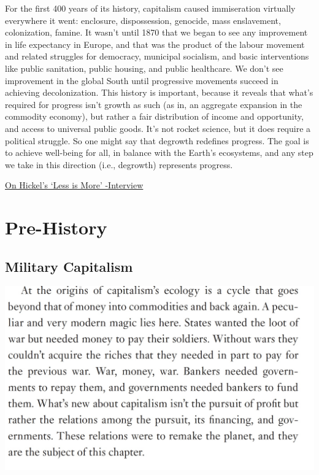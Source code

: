 \documentclass[
]{book}
\begin{document}
For the first 400 years of its history, capitalism caused immiseration virtually everywhere it went: enclosure, dispossession, genocide, mass enslavement, colonization, famine. It wasn't until 1870 that we began to see any improvement in life expectancy in Europe, and that was the product of the labour movement and related struggles for democracy, municipal socialism, and basic interventions like public sanitation, public housing, and public healthcare. We don't see improvement in the global South until progressive movements succeed in achieving decolonization. This history is important, because it reveals that what's required for progress isn't growth as such (as in, an aggregate expansion in the commodity economy), but rather a fair distribution of income and opportunity, and access to universal public goods. It's not rocket science, but it does require a political struggle. So one might say that degrowth redefines progress. The goal is to achieve well-being for all, in balance with the Earth's ecosystems, and any step we take in this direction (i.e., degrowth) represents progress.

\href{https://www.the-trouble.com/content/2021/2/11/ecosocialism-is-the-horizon-degrowth-is-the-way}{On Hickel's `Less is More' -Interview}

\hypertarget{pre-history}{%
\section{Pre-History}\label{pre-history}}

\hypertarget{military-capitalism}{%
\subsection{Military Capitalism}\label{military-capitalism}}

\includegraphics{fig/priya_satia_empire_of_guns.jpg}
\end{document}

